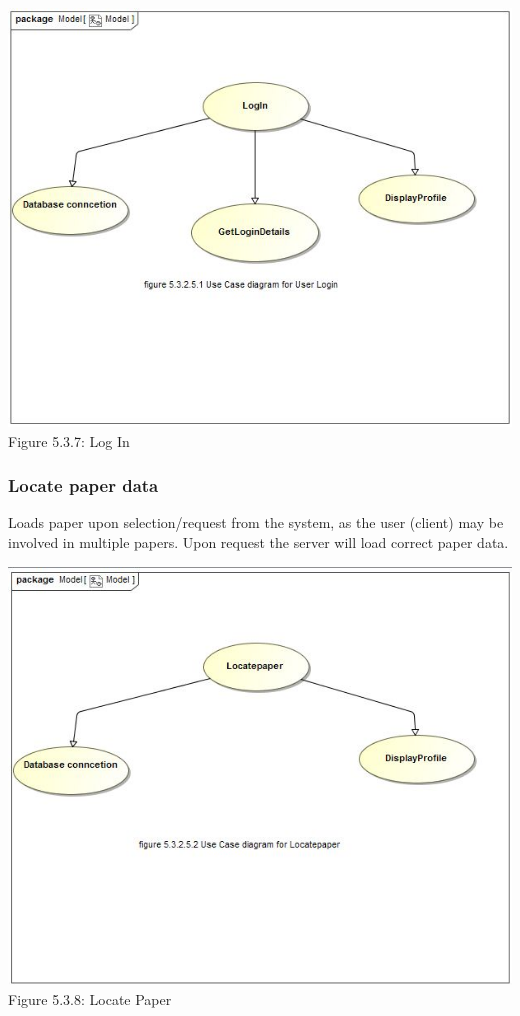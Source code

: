 \documentclass[hidelinks,a4paper,12pt]{article}
\begin{document}
			\includegraphics[width=1\textwidth]{./Graphs/UseCaseforLogIn.JPG}\\[0.4cm]
			Figure 5.3.7: Log In
		
		\subsubsection{Locate paper data}
		
		Loads paper upon selection/request from the system, as the user (client)  
		may be involved in multiple papers. Upon request the server will load 
		correct paper data. 
		
			\includegraphics[width=1\textwidth]{./Graphs/UseCaseDiagramforLocatePaper.JPG}\\[0.4cm]
			Figure 5.3.8: Locate Paper
		
\end{document}
